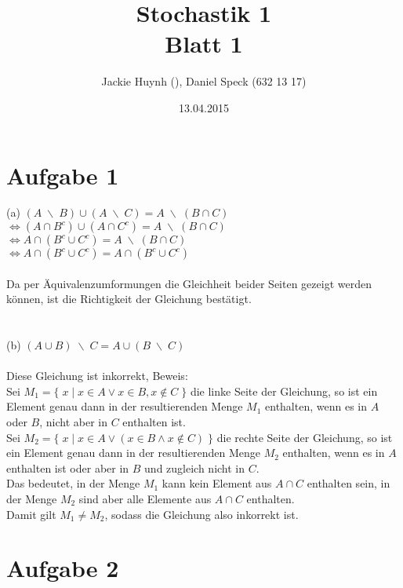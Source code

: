 \documentclass[10pt,a4paper]{article}
\title{\textbf{\huge Stochastik 1
\\\large Blatt 1}}
\author{Jackie Huynh (), Daniel Speck (632 13 17)}
\date{13.04.2015}
\newcommand{\bs}{\;\backslash\;}
\begin{document}
	\maketitle


	\section*{Aufgabe 1}
	
		(a) \quad
		$(A \bs B) \cup (A \bs C) = A \bs (B \cap C)$
		\\
		$\Leftrightarrow (A \cap B^c) \cup (A \cap C^c) = A \bs (B \cap C)$
		\\
		$\Leftrightarrow A \cap (B^c \cup C^c) = A \bs (B \cap C)$
		\\
		$\Leftrightarrow A \cap (B^c \cup C^c) = A \cap (B^c \cup C^c)$
		\\
		\\
		Da per Äquivalenzumformungen die Gleichheit beider Seiten gezeigt werden können, ist die Richtigkeit der Gleichung bestätigt.
		\\
		\\
		\\
		(b) \quad
		$(A \cup B) \bs C = A \cup (B \bs C)$
		\\
		\\
		Diese Gleichung ist inkorrekt, Beweis:
		\\
		Sei $M_1 = \{\; x \;|\; x \in A \lor x \in B, x \not\in C \;\}$ die linke Seite der Gleichung, so ist ein Element genau dann in der resultierenden Menge $M_1$ enthalten, wenn es in $A$ oder $B$, nicht aber in $C$ enthalten ist.
		\\
		Sei $M_2 = \{\; x \;|\; x \in A \lor (x \in B \land x \not\in C) \;\}$ die rechte Seite der Gleichung, so ist ein Element genau dann in der resultierenden Menge $M_2$ enthalten, wenn es in $A$ enthalten ist oder aber in $B$ und zugleich nicht in $C$.
		\\
		Das bedeutet, in der Menge $M_1$ kann kein Element aus $A \cap C$ enthalten sein, in der Menge $M_2$ sind aber alle Elemente aus $A \cap C$ enthalten.
		\\
		Damit gilt $M_1 \neq M_2$, sodass die Gleichung also inkorrekt ist.
		
		\begin{flushright}
			\text{$\Box$}
		\end{flushright}


	\section*{Aufgabe 2}
\end{document}
